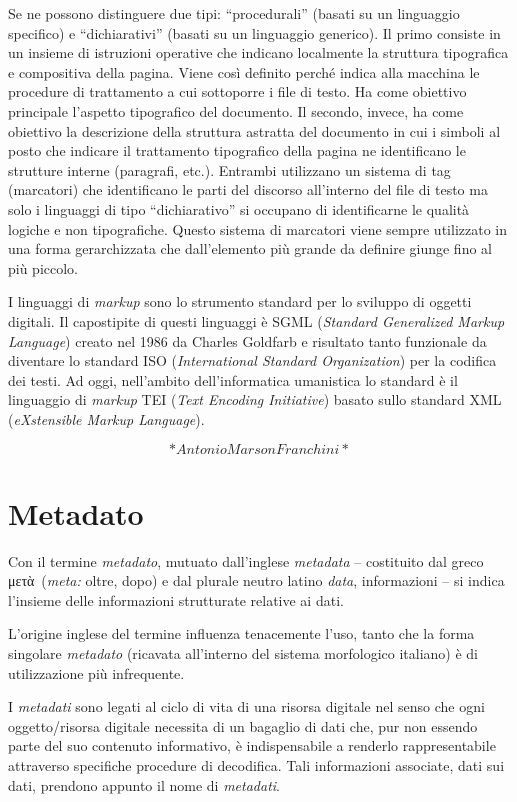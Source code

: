 \documentclass[
  b5paper,
  twoside,
  11pt,
  chapterprefix=false,
  bibliography=totocnumbered,
  parskip=0]{scrbook}
\begin{document}
Se ne possono distinguere due tipi: \enquote{procedurali} (basati su un
linguaggio specifico) e \enquote{dichiarativi} (basati su un linguaggio
generico). Il primo consiste in un insieme di istruzioni operative che
indicano localmente la struttura tipografica e compositiva della pagina.
Viene così definito perché indica alla macchina le procedure di
trattamento a cui sottoporre i file di testo. Ha come obiettivo
principale l'aspetto tipografico del documento. Il secondo, invece, ha
come obiettivo la descrizione della struttura astratta del documento in
cui i simboli al posto che indicare il trattamento tipografico della
pagina ne identificano le strutture interne (paragrafi, etc.). Entrambi
utilizzano un sistema di tag (marcatori) che identificano le parti del
discorso all'interno del file di testo ma solo i linguaggi di tipo
\enquote{dichiarativo} si occupano di identificarne le qualità logiche e non
tipografiche. Questo sistema di marcatori viene sempre utilizzato in una
forma gerarchizzata che dall'elemento più grande da definire giunge fino
al più piccolo.

I linguaggi di \emph{markup} sono lo strumento standard per lo sviluppo di
oggetti digitali. Il capostipite di questi linguaggi è SGML (\emph{Standard
Generalized Markup Language}) creato nel 1986 da Charles Goldfarb e
risultato tanto funzionale da diventare lo standard ISO (\emph{International
Standard Organization}) per la codifica dei testi. Ad oggi, nell'ambito
dell'informatica umanistica lo standard è il linguaggio di \emph{markup} TEI
(\emph{Text Encoding Initiative}) basato sullo standard XML (\emph{eXstensible
Markup Language}).

\[*Antonio Marson Franchini*\]

\hypertarget{metadato}{%
\chapter{Metadato}\label{metadato}}

Con il termine \emph{metadato}, mutuato dall'inglese \emph{metadata} -- costituito
dal greco μετὰ~(\emph{meta:} oltre, dopo) e dal plurale neutro latino \emph{data},
informazioni -- si indica l'insieme delle informazioni strutturate
relative ai dati.

L'origine inglese del termine influenza tenacemente l'uso, tanto che la
forma singolare \emph{metadato} (ricavata all'interno del sistema morfologico
italiano) è di utilizzazione più infrequente.

I \emph{metadati} sono legati al ciclo di vita di una risorsa digitale nel
senso che ogni oggetto/risorsa digitale necessita di un bagaglio di dati
che, pur non essendo parte del suo contenuto informativo, è
indispensabile a renderlo rappresentabile attraverso specifiche
procedure di decodifica. Tali informazioni associate, dati sui dati,
prendono appunto il nome di \emph{metadati}.
\end{document}

